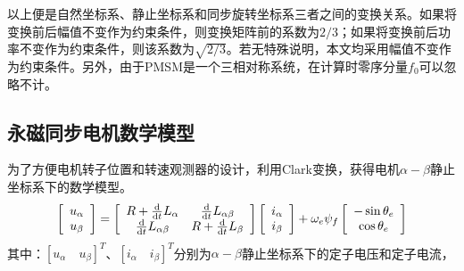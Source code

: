 以上便是自然坐标系、静止坐标系和同步旋转坐标系三者之间的变换关系。如果将变换前后幅值不变作为约束条件，则变换矩阵前的系数为$2/3$；如果将变换前后功率不变作为约束条件，则该系数为$\sqrt{2/3}$。若无特殊说明，本文均采用幅值不变作为约束条件。另外，由于PMSM是一个三相对称系统，在计算时零序分量$f_0$可以忽略不计。
\subsection{永磁同步电机数学模型}
为了方便电机转子位置和转速观测器的设计，利用Clark变换，获得电机$\alpha-\beta$静止坐标系下的数学模型。
\begin{equation}
\label{ }
\left[\begin{array}{c}u_\alpha \\u_\beta\end{array}\right]=\left[\begin{array}{cc}R+\frac{\diff}{{\diff}t}L_\alpha & \frac{\diff}{{\diff}t}L_{\alpha\beta} \\ \frac{\diff}{{\diff}t}L_{\alpha\beta} & R+\frac{\diff}{{\diff}t}L_\beta\end{array}\right]\left[\begin{array}{c}i_\alpha \\i_\beta\end{array}\right]+\omega_e\psi_f\left[\begin{array}{c}-\sin{\theta_e} \\ \cos{\theta_e}\end{array}\right]
\end{equation}
其中：$[u_\alpha \quad u_\beta]^T$、$[i_\alpha \quad i_\beta]^T$分别为$\alpha-\beta$静止坐标系下的定子电压和定子电流，

